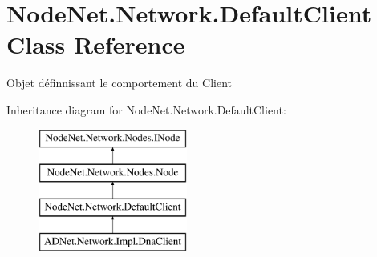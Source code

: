\hypertarget{class_node_net_1_1_network_1_1_default_client}{}\section{Node\+Net.\+Network.\+Default\+Client Class Reference}
\label{class_node_net_1_1_network_1_1_default_client}


Objet définnissant le comportement du Client  


Inheritance diagram for Node\+Net.\+Network.\+Default\+Client\+:\begin{figure}[H]
\begin{center}
\leavevmode
\includegraphics[height=4.000000cm]{class_node_net_1_1_network_1_1_default_client}
\end{center}
\end{figure}
